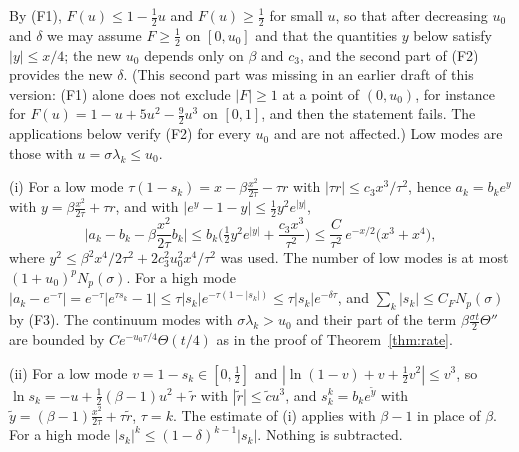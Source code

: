 \documentclass[11pt,a4paper]{article}
\makeatletter
\theoremstyle{stmt}
\theoremstyle{defn}
\theoremstyle{rmk}
\renewenvironment{proof}[1][\proofname]{\par\pushQED{\qed}\normalfont\topsep6\p@\@plus6\p@\relax
  \trivlist\item[\hskip\labelsep{\sffamily\itshape\small #1.}]\ignorespaces}{\popQED\endtrivlist\@endpefalse}
\numberwithin{equation}{section}
\makeatother
\begin{document}
{\begin{proof}
By (F1), $F(u)\le1-\tfrac12u$ and $F(u)\ge\tfrac12$ for small $u$, so that after decreasing $u_0$ and $\delta$ we may assume $F\ge\tfrac12$ on $[0,u_0]$ and that the quantities $y$ below satisfy $|y|\le x/4$; the new $u_0$ depends only on $\beta$ and $c_3$, and the second part of \textup{(F2)} provides the new $\delta$. (This second part was missing in an earlier draft of this version: \textup{(F1)} alone does not exclude $|F|\ge1$ at a point of $(0,u_0)$, for instance for $F(u)=1-u+5u^2-\tfrac92u^3$ on $[0,1]$, and then the statement fails. The applications below verify \textup{(F2)} for every $u_0$ and are not affected.) Low modes are those with $u=\sigma\lambda_k\le u_0$.

(i) For a low mode $\tau(1-s_k)=x-\beta\tfrac{x^2}{2\tau}-\tau r$ with $|\tau r|\le c_3x^3/\tau^2$, hence $a_k=b_ke^{y}$ with $y=\beta\tfrac{x^2}{2\tau}+\tau r$, and with $|e^{y}-1-y|\le\tfrac12y^2e^{|y|}$,
\[
\Big|a_k-b_k-\beta\frac{x^2}{2\tau}b_k\Big|\le b_k\Big(\tfrac12y^2e^{|y|}+\frac{c_3x^3}{\tau^2}\Big)\le\frac{C}{\tau^2}\,e^{-x/2}\big(x^3+x^4\big),
\]
where $y^2\le\beta^2x^4/2\tau^2+2c_3^2u_0^2x^4/\tau^2$ was used. The number of low modes is at most $(1+u_0)^pN_p(\sigma)$. For a high mode $|a_k-e^{-\tau}|=e^{-\tau}|e^{\tau s_k}-1|\le\tau|s_k|e^{-\tau(1-|s_k|)}\le\tau|s_k|e^{-\delta\tau}$, and $\sum_k|s_k|\le C_FN_p(\sigma)$ by (F3). The continuum modes with $\sigma\lambda_k>u_0$ and their part of the term $\beta\tfrac{\sigma t}2\Theta''$ are bounded by $C e^{-u_0\tau/4}\Theta(t/4)$ as in the proof of Theorem~\ref{thm:rate}.

(ii) For a low mode $v=1-s_k\in[0,\tfrac12]$ and $|\ln(1-v)+v+\tfrac12v^2|\le v^3$, so $\ln s_k=-u+\tfrac12(\beta-1)u^2+\tilde r$ with $|\tilde r|\le\tilde cu^3$, and $s_k^k=b_ke^{\tilde y}$ with $\tilde y=(\beta-1)\tfrac{x^2}{2\tau}+\tau\tilde r$, $\tau=k$. The estimate of (i) applies with $\beta-1$ in place of $\beta$. For a high mode $|s_k|^k\le(1-\delta)^{k-1}|s_k|$. Nothing is subtracted.
\end{proof}

}
\end{document}
